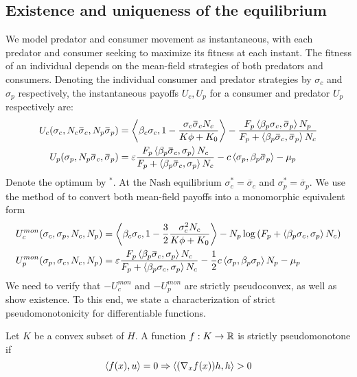 \subsection{Existence and uniqueness of the equilibrium}
We model predator and consumer movement as instantaneous, with each predator and consumer seeking to maximize its fitness at each instant. The fitness of an individual depends on the mean-field strategies of both predators and consumers. Denoting the individual consumer and predator strategies by $\sigma_c$ and $\sigma_p$ respectively, the instantaneous payoffs $U_c,U_p$ for a consumer and predator $U_p$ respectively are:
\begin{align}
  U_c(\sigma_c, N_c \overbar{\sigma}_c, N_p\overbar{\sigma}_p) &= \ip{\beta_c \sigma_c}{1-\frac{\sigma_c \overbar{\sigma}_c N_c}{K\phi + K_0}} - \frac{F_p \ip{\beta_p \sigma_c}{\overbar{\sigma}_p} N_p}{F_p + \ip{\beta_p \overbar{\sigma}_c}{\overbar{\sigma}_p} N_c} \\
  U_p(\sigma_p, N_p \overbar{\sigma}_c, \overbar{\sigma}_p) &= \epsilon \frac{F_p \ip{\beta_p \overbar{\sigma}_c}{\sigma_p} N_c}{F_p + \ip{\beta_p \overbar{\sigma}_c}{\sigma_p} N_c} - c \ip{\sigma_p}{\beta_p \overbar{\sigma}_p}  - \mu_p
\end{align}
Denote the optimum by $^*$. At the Nash equilibrium $\sigma_c^*=\overbar{\sigma}_c$ and $\sigma_p^* = \overbar{\sigma}_p$. We use the method of  to convert both mean-field payoffs into a monomorphic equivalent form 
\begin{align}
  \label{eq:mon_eq_forms}
  U_c^{mon}(\sigma_c, \sigma_p, N_c, N_p) &= \ip{\beta_c \sigma_c}{1-\frac{3}{2}\frac{\sigma_c^2 N_c}{K\phi + K_0}} - N_p\log\pa{F_p + \ip{\beta_p \sigma_c}{\sigma_p} N_c} \\
  U_p^{mon}(\sigma_p, \sigma_c, N_c, N_p) &= \epsilon \frac{F_p \ip{\beta_p \overbar{\sigma}_c}{\sigma_p} N_c}{F_p + \ip{\beta_p \sigma_c}{\sigma_p} N_c} - \frac{1}{2}c \ip{\sigma_p}{\beta_p \sigma_p}N_p  - \mu_p
\end{align}
We need to verify that $-U_c^{mon}$ and $-U_p^{mon}$ are strictly pseudoconvex, as well as show existence. To this end, we state a characterization of strict pseudomonotonicity for differentiable functions.
\begin{lemma}
  Let $K$ be a convex subset of $H$. A function $f: K \to \mathbb{R}$ is strictly pseudomonotone if
  \begin{equation}
    \left \langle f(x),u \right \rangle = 0 \Rightarrow \left \langle (\nabla_x f(x))h,h \right \rangle > 0
  \end{equation}
\end{lemma}
